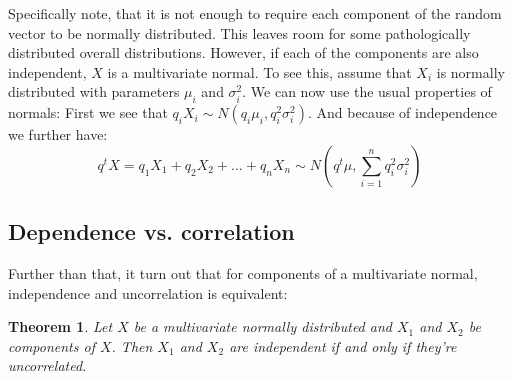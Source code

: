 \documentclass[12pt, a4paper]{article}
\newtheorem{theorem}{Theorem}[section]
\numberwithin{equation}{section}
\begin{document}
Specifically note, that it is not enough to require each component of the random vector to be normally distributed. This leaves room for some pathologically distributed overall distributions. However, if each of the components are also independent, $X$ is a multivariate normal. To see this, assume that $X_i$ is normally distributed with parameters $\mu_i$ and $\sigma_i^2$. We can now use the usual properties of normals: First we see that $q_i X_i\sim N(q_i\mu_i,q_i^2\sigma_i^2)$. And because of independence we further have:
\begin{equation}
q^t X=q_1 X_1+q_2 X_2+\ldots +q_n X_n\sim N\left(q^t\mu,\sum_{i=1}^n q_i^2\sigma_i^2\right)
\end{equation}

\subsection{Dependence vs. correlation}
Further than that, it turn out that for components of a multivariate normal, independence and uncorrelation is equivalent:
\begin{theorem}
Let $X$ be a multivariate normally distributed and $X_1$ and $X_2$ be components of $X$. Then $X_1$ and $X_2$ are independent if and only if they're uncorrelated.
\end{theorem}
\end{document}
